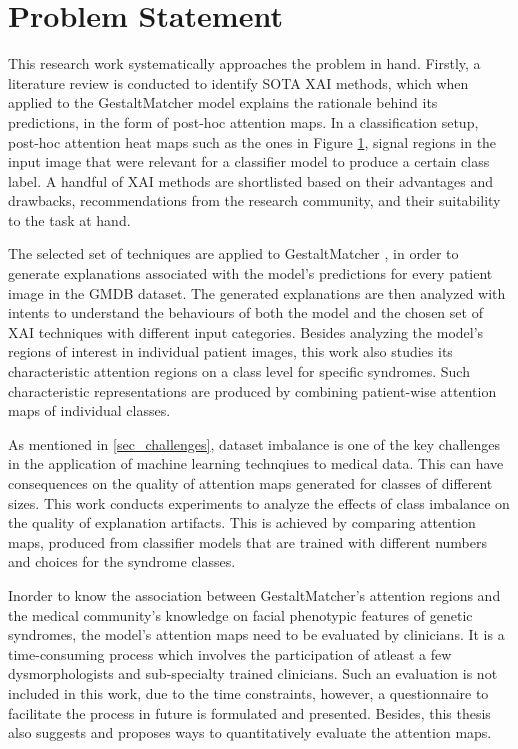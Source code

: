 \documentclass[../report.tex]{subfiles}
\begin{document}
    \section{Problem Statement}
 	This research work systematically approaches the problem in hand. Firstly, a literature review is conducted to identify SOTA XAI methods, which when applied to the GestaltMatcher model explains the rationale behind its predictions, in the form of post-hoc attention maps. In a classification setup, post-hoc attention heat maps such as the ones in Figure \ref{}, signal regions in the input image that were relevant for a classifier model to produce a certain class label. A handful of XAI methods are shortlisted based on their advantages and drawbacks, recommendations from the research community, and their suitability to the task at hand. 
 	
 	The selected set of techniques are applied to GestaltMatcher \cite{hsieh2022gestaltmatcher}, in order to generate explanations associated with the model's predictions for every patient image in the GMDB \cite{hsieh2022gestaltmatcher} dataset. The generated explanations are then analyzed with intents to understand the behaviours of both the model and the chosen set of XAI techniques with different input categories. Besides analyzing the model's regions of interest in individual patient images, this work also studies its characteristic attention regions on a class level for specific syndromes. Such characteristic representations are produced by combining patient-wise attention maps of individual classes. 
 	
 	As mentioned in \ref{sec_challenges}, dataset imbalance is one of the key challenges in the application of machine learning technqiues to medical data. This can have consequences on the quality of attention maps generated for classes of different sizes. This work conducts experiments to analyze the effects of class imbalance on the quality of explanation artifacts. This is achieved by comparing attention maps, produced from classifier models that are trained with different numbers and choices for the syndrome classes. 
 	
 	Inorder to know the association between GestaltMatcher's attention regions and the medical community's knowledge on facial phenotypic features of genetic syndromes, the model's attention maps need to be evaluated by clinicians. It is a time-consuming process which involves the participation of atleast a few dysmorphologists and sub-specialty trained clinicians. Such an evaluation is not included in this work, due to the time constraints, however, a questionnaire to facilitate the process in future is formulated and presented. Besides, this thesis also suggests and proposes ways to quantitatively evaluate the attention maps. 
 	
\end{document}
